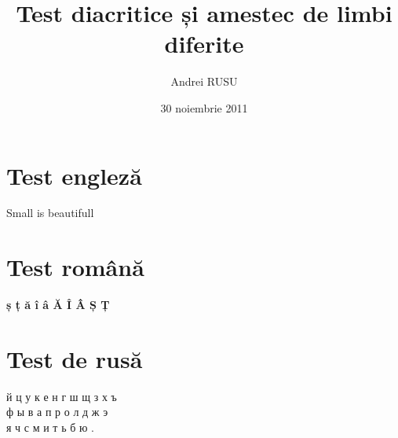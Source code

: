 ﻿\documentclass{article}
\author{Andrei RUSU}
\title{Test diacritice și amestec de limbi diferite}
\date{30 noiembrie 2011}
\begin{document}
\maketitle

\tableofcontents

\section{Test engleză}

Small is beautifull

\section{Test română}

{\Huge{\textbf{ș ț ă î â Ă Î Â Ș Ț}}}

\section{Test de rusă}

й ц у к е н г ш щ з х ъ \\

ф ы в а п р о л д ж э \\

я ч с м и т ь б ю .
\end{document}
